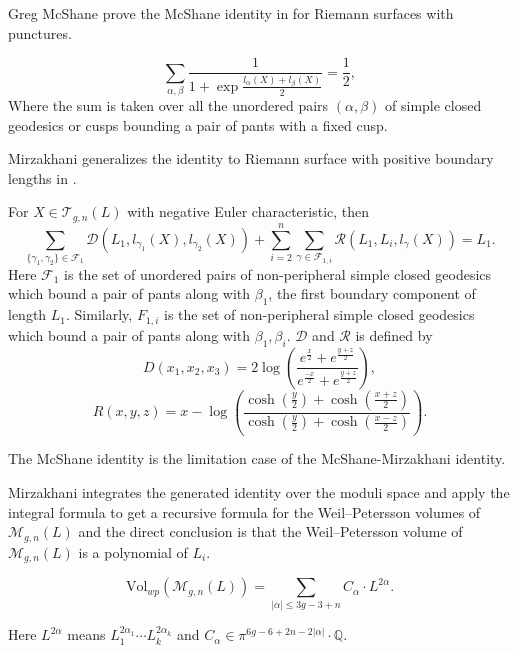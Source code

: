 Greg McShane prove the McShane identity in \cite{McShane1998SimpleGA} for Riemann surfaces with punctures.

\begin{thma}
$$\sum_{\alpha,\beta}\frac{1}{1+\exp{\frac{l_\alpha(X)+l_\beta(X)}{2}}}=\frac{1}{2},$$
Where the sum is taken over all the unordered  pairs $(\alpha,\beta)$ of simple closed geodesics or cusps bounding  a pair of pants with a fixed cusp. 
\end{thma}

Mirzakhani generalizes the identity to Riemann surface with positive boundary lengths in \cite{Mirzakhani:2006fta}. 

\begin{thma}
For $X\in \mathscr{T}_{g,n}(L)$ with negative Euler characteristic,  then $$
\sum_{\{\gamma_1,\gamma_2\}\in\mathscr{F}_1}\mathscr{D}(L_1,l_{\gamma_1}(X),l_{\gamma_2}(X))+\sum_{i=2}^n\sum_{\gamma\in \mathscr{F}_{1,i}}\mathscr{R}(L_1,L_i,l_{\gamma}(X))=L_1.
$$
Here $\mathscr{F}_1$ is the set of unordered  pairs of non-peripheral  simple closed geodesics which bound a pair of pants along with $\beta_1$, the first boundary component of length $L_1$. Similarly, $F_{1,i}$ is the set of non-peripheral simple closed geodesics which bound a pair of pants along with $\beta_1,\beta_i$.  $\mathscr{D}$ and $\mathscr{R}$ is defined by 
\begin{equation*}\label{D}
  D(x_1,x_2,x_3)=2\log \left(\frac{e^{\frac{x}{2}}+e^{\frac{y+z}{2}}}{e^{\frac{-x}{2}}+e^{\frac{y+z}{2}}}\right),
  \end{equation*}
 \begin{equation*}\label{R}
     R(x,y,z)=x-\log \left(\frac{\cosh(\frac{y}{2})+\cosh (\frac{x+z}{2})}{\cosh(\frac{y}{2})+\cosh (\frac{x-z}{2})}\right).
 \end{equation*}
 \end{thma}
 
 The McShane identity is the limitation case of the McShane-Mirzakhani identity.
 
 
 Mirzakhani integrates the generated identity over the moduli space and apply the integral formula to get a recursive formula for the Weil--Petersson volumes of $\mathscr{M}_{g,n}(L)$ and the direct conclusion is that the Weil--Petersson volume of $\mathscr{M}_{g,n}(L)$ is a polynomial of $L_i$.
 
 \begin{thma}
$$\mathrm{Vol}_{wp}(\mathscr{M}_{g,n}(L))=\sum_{|\alpha|\leq 3g-3+n}C_\alpha\cdot L^{2\alpha}.$$

Here $L^{2\alpha}$ means $L_1^{2\alpha_1}\cdots L_k^{2\alpha_k}$ and $C_\alpha\in \pi^{6g-6+2n-2|\alpha|}\cdot \mathbb{Q}$.
 \end{thma}
 
